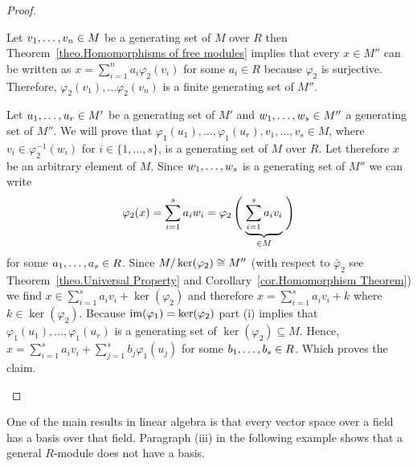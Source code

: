 \begin{proof}
\begin{plist}
\item Let $\seq{v}\in M$ be a generating set of $M$ over $R$ then Theorem~\ref{theo.Homomorphisms of free modules} implies that every $x\in M''$ can be written as $x=\sum_{i=1}^n a_i\varphi_2(v_i)$ for some $a_i\in R$ because $\varphi_2$ is surjective. Therefore, $\varphi_2(v_1),\ldots\varphi_2(v_n)$ is a finite generating set of $M''$.
\item Let $\seq[r]{u}\in M'$ be a generating set of $M'$ and $\seq[s]{w}\in M''$ a generating set of $M''$. We will prove that $\varphi_1(u_1),\ldots,\varphi_1(u_r),v_1,\ldots,v_s\in M$, where $v_i\in\varphi_2^{-1}(w_i)$ for $i\in\lbrace 1,\ldots,s\rbrace$, is a generating set of $M$ over $R$. Let therefore $x$ be an arbitrary element of $M$. Since $\seq[s]{w}$ is a generating set of $M''$ we can write 
\begin{equation*}
\varphi_2(x)=\sum_{i=1}^s a_i w_i=\varphi_2\left(\vphantom{\sum_{i=1}^s}\right.
\underbrace{\sum_{i=1}^s a_i v_i}_{\in M}
\left. \vphantom{\sum_{i=1}^s}\right)
\end{equation*}
for some $\seq[s]{a}\in R$. Since $\nicefrac{M}{\ker(\varphi_2)}\cong M''$ (with respect to $\bar{\varphi}_2$ see Theorem~\ref{theo.Universal Property} and Corollary~\ref{cor.Homomorphism Theorem}) we find $x\in \sum_{i=1}^s a_i v_i+\ker(\varphi_2)$ and therefore $x=\sum_{i=1}^s a_i v_i+k$ where $k\in\ker(\varphi_2)$. Because $\im(\varphi_1)=\ker(\varphi_2)$ part (i) implies that $\varphi_1(u_1),\ldots,\varphi_1(u_r)$ is a generating set of $\ker(\varphi_2)\subseteq M$. Hence, $x=\sum_{i=1}^s a_i v_i+\sum_{j=1}^s b_j \varphi_1(u_j)$ for some $\seq[s]{b}\in R$. Which proves the claim.
\end{plist}
\end{proof}

One of the main results in linear algebra is that every vector space over a field has a basis over that field. Paragraph (iii) in the following example shows that a general $R$-module does not have a basis.

